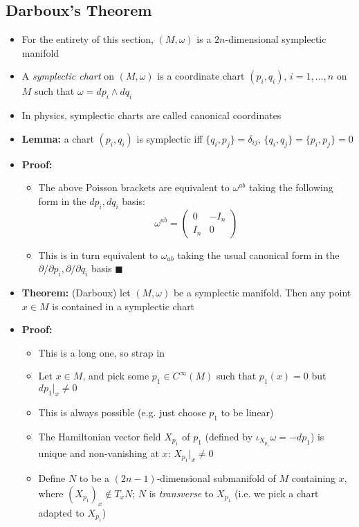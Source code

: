 \documentclass[12pt,a4paper]{article}
\numberwithin{equation}{section}
\begin{document}
	\subsection{Darboux's Theorem}
	\begin{itemize}
		\item For the entirety of this section, $(M,\omega)$ is a $2n$-dimensional symplectic manifold
		\item A \textit{symplectic chart} on $(M,\omega)$ is a coordinate chart $(p_{i},q_{i}),\,i=1,\ldots,n$ on $M$ such that $\omega=dp_{i}\wedge dq_{i}$
		\item In physics, symplectic charts are called canonical coordinates
		\item \textbf{Lemma:} a chart $(p_{i},q_{i})$ is symplectic iff $\{q_{i},p_{j}\}=\delta_{ij}$, $\{q_{i},q_{j}\}=\{p_{i},p_{j}\}=0$
		\item \textbf{Proof:}
		\begin{itemize}
			\item The above Poisson brackets are equivalent to $\omega^{ab}$ taking the following form in the $dp_{i},dq_{i}$ basis:
			\begin{equation}
				\omega^{ab}=\begin{pmatrix}0&-I_{n}\\I_{n}&0\end{pmatrix}
			\end{equation}
			\item This is in turn equivalent to $\omega_{ab}$ taking the usual canonical form in the $\partial/\partial p_{i},\partial/\partial q_{i}$ basis $\blacksquare$
		\end{itemize}
		\item \textbf{Theorem:} (Darboux) let $(M,\omega)$ be a symplectic manifold. Then any point $x\in M$ is contained in a symplectic chart
		\item \textbf{Proof:}
		\begin{itemize}
			\item This is a long one, so strap in
			\item Let $x\in M$, and pick some $p_{1}\in C^{\infty}(M)$ such that $p_{1}(x)=0$ but $dp_{1}\rvert_{x}\neq 0$
			\item This is always possible (e.g. just choose $p_{1}$ to be linear)
			\item The Hamiltonian vector field $X_{p_{1}}$ of $p_{1}$ (defined by $\iota_{X_{p_{1}}}\omega=-dp_{1}$) is unique and non-vanishing at $x$: $X_{p_{1}}\rvert_{x}\neq 0$
			\item Define $N$ to be a $(2n-1)$-dimensional submanifold of $M$ containing $x$, where $(X_{p_{1}})_{x}\notin T_{x}N$; $N$ is \textit{transverse} to $X_{p_{1}}$ (i.e. we pick a chart adapted to $X_{p_{1}}$)

\end{itemize}
\end{itemize}
\end{document}
